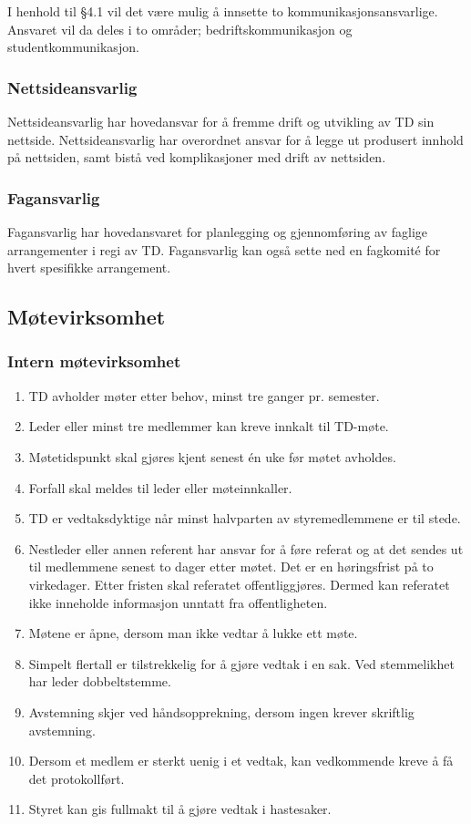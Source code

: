 \documentclass[11pt]{article}
\begin{document}
I henhold til §4.1 vil det være mulig å innsette to kommunikasjonsansvarlige. Ansvaret vil da deles i to områder; bedriftskommunikasjon og studentkommunikasjon.

\subsubsection{Nettsideansvarlig}
Nettsideansvarlig har hovedansvar for å fremme drift og utvikling av TD sin nettside. Nettsideansvarlig har overordnet ansvar for å legge ut produsert innhold på nettsiden, samt bistå ved komplikasjoner med drift av nettsiden.

\subsubsection{Fagansvarlig}
Fagansvarlig har hovedansvaret for planlegging og gjennomføring av faglige arrangementer i regi av TD. Fagansvarlig kan også sette ned en fagkomité for hvert spesifikke arrangement.

\subsection{Møtevirksomhet}
\subsubsection{Intern møtevirksomhet}
\begin{enumerate}
	\item TD avholder møter etter behov, minst tre ganger pr. semester.
	\item Leder eller minst tre medlemmer kan kreve innkalt til TD-møte.
	\item Møtetidspunkt skal gjøres kjent senest én uke før møtet avholdes.
	\item Forfall skal meldes til leder eller møteinnkaller.
	\item TD er vedtaksdyktige når minst halvparten av styremedlemmene er til stede.
	\item Nestleder eller annen referent har ansvar for å føre referat og at det sendes ut til medlemmene senest to dager etter møtet. Det er en høringsfrist på to virkedager. Etter fristen skal referatet offentliggjøres. Dermed kan referatet ikke inneholde informasjon unntatt fra offentligheten.
	\item Møtene er åpne, dersom man ikke vedtar å lukke ett møte.
	\item Simpelt flertall er tilstrekkelig for å gjøre vedtak i en sak. Ved stemmelikhet har leder dobbeltstemme.
	\item Avstemning skjer ved håndsopprekning, dersom ingen krever skriftlig avstemning.
	\item Dersom et medlem er sterkt uenig i et vedtak, kan vedkommende kreve å få det protokollført.
	\item Styret kan gis fullmakt til å gjøre vedtak i hastesaker.
\end{enumerate}
\end{document}
